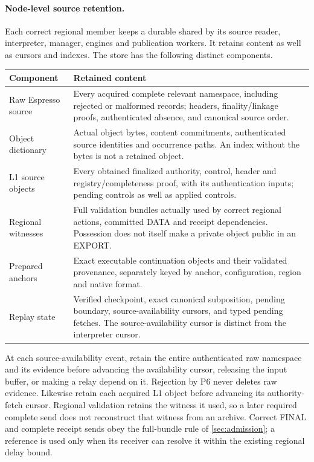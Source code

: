 \paragraph{Node-level source retention.}
\label{sec:source-step}
\label{sec:source-retention}
Each correct regional member keeps a durable  shared
by its source reader, interpreter, manager, engines and publication
workers. It retains content as well as cursors and indexes. The store
has the following distinct components.
\begin{table}[htbp]\centering\small
\begin{tabularx}{\linewidth}{@{}>{\raggedright\arraybackslash}p{.24\linewidth}Y@{}}\toprule
Component & Retained content\\\midrule
Raw Espresso source & Every acquired complete relevant namespace,
including rejected or malformed records; headers, finality/linkage
proofs, authenticated absence, and canonical source order.\\
Object dictionary & Actual object bytes, content commitments,
authenticated source identities and occurrence paths. An index without
the bytes is not a retained object.\\
L1 source objects & Every obtained finalized authority, control,
header and registry/completeness proof, with its authentication inputs;
pending controls as well as applied controls.\\
Regional witnesses & Full validation bundles actually used by correct
regional actions, committed DATA and receipt dependencies. Possession
does not itself make a private object public in an EXPORT.\\
Prepared anchors & Exact executable continuation objects and their
validated provenance, separately keyed by anchor, configuration,
region and native format.\\
Replay state & Verified checkpoint, exact canonical subposition,
pending boundary, source-availability cursors, and typed pending fetches.
The source-availability cursor is distinct from the interpreter cursor.\\\bottomrule
\end{tabularx}
\end{table}

At each source-availability event, retain the entire authenticated raw
namespace and its evidence before advancing the availability cursor,
releasing the input buffer, or making a relay depend on it. Rejection
by P6 never deletes raw evidence. Likewise retain each acquired L1
object before advancing its authority-fetch cursor. Regional validation
retains the witness it used, so a later required complete send does not
reconstruct that witness from an archive. Correct FINAL and complete
receipt sends obey the full-bundle rule of \cref{sec:admission}; a
reference is used only when its receiver can resolve it within the
existing regional delay bound.

